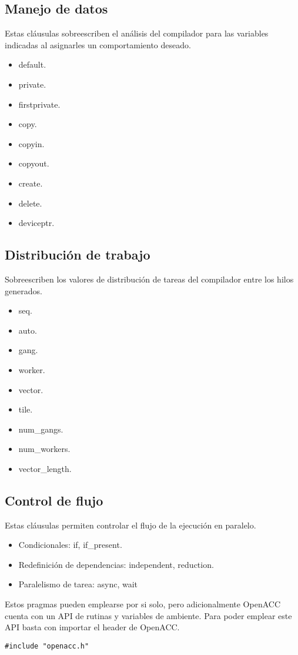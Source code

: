 \subsection*{Manejo de datos}
Estas cláusulas sobreescriben el análisis del compilador para las variables indicadas al asignarles un comportamiento deseado.
\begin{itemize}
    \item default.
    \item private.
    \item firstprivate.
    \item copy.
    \item copyin.
    \item copyout.
    \item create.
    \item delete.
    \item deviceptr.
\end{itemize}

\subsection*{Distribución de trabajo}
Sobreescriben los valores de distribución de tareas del compilador entre los hilos generados.
\begin{itemize}
    \item seq.
    \item auto.
    \item gang.
    \item worker.
    \item vector.
    \item tile.
    \item num\_gangs.
    \item num\_workers.
    \item vector\_length.
\end{itemize}

\subsection*{Control de flujo}
Estas cláusulas permiten controlar el flujo de la ejecución en paralelo.

\begin{itemize}
    \item Condicionales: if, if\_present.
    \item Redefinición de dependencias: independent, reduction.
    \item Paralelismo de tarea: async, wait
\end{itemize}

Estos pragmas pueden emplearse por si solo, pero adicionalmente OpenACC cuenta con un API de rutinas y variables de ambiente. Para poder emplear este API basta con importar el header de OpenACC.

\begin{lstlisting}[style=CStyle]
#include "openacc.h"
\end{lstlisting}

\clearpage